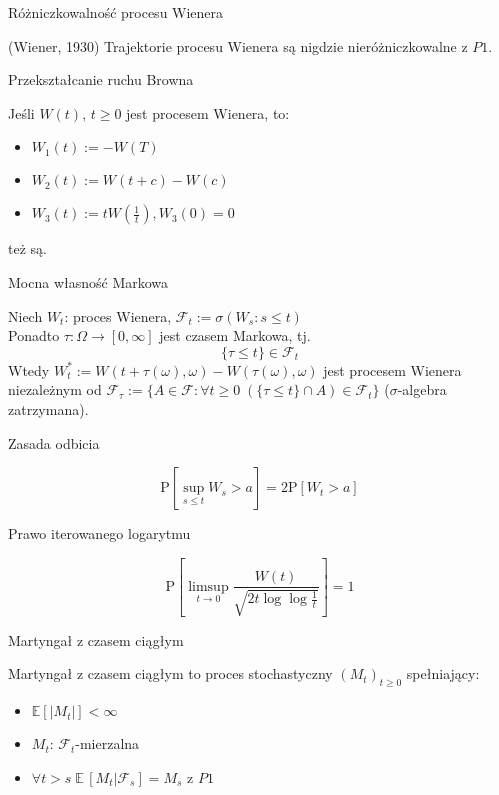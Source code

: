 \documentclass[avery5371, grid, frame]{flashcards}
\begin{document}
\begin{flashcard}[Twierdzenie]{Różniczkowalność procesu Wienera}

\smallskip
(Wiener, 1930) Trajektorie procesu Wienera są nigdzie nieróżniczkowalne z $P1$.
\end{flashcard}

\begin{flashcard}[Twierdzenie]{Przekształcanie ruchu Browna}

\smallskip
Jeśli $W(t)$, $t \geq 0$ jest procesem Wienera, to:
\begin{itemize}
\item $W_1(t) := -W(T)$
\item $W_2(t) := W(t+c) - W(c)$
\item $W_3(t) := tW(\frac{1}{t}), W_3(0)=0$ 
\end{itemize}
też są.	
\end{flashcard}

\begin{flashcard}[Twierdzenie]{Mocna własność Markowa}

\smallskip
Niech $W_t$: proces Wienera, $\mathcal{F}_t := \sigma (W_s : s \leq t) $ \\
Ponadto $\tau: \Omega \rightarrow [0, \infty]$ jest czasem Markowa, tj. $$ \{ \tau \leq t \} \in \mathcal{F}_t$$
Wtedy $W ^* _t := W(t + \tau(\omega), \omega) - W(\tau(\omega), \omega)$ jest procesem Wienera niezależnym od $\mathcal{F}_\tau := \{ A \in \mathcal{F} : \forall t \geq 0 \; ( \{\tau \leq t \} \cap A) \in \mathcal{F}_t \} $ ($\sigma$-algebra zatrzymana).
\end{flashcard}

\begin{flashcard}[Twierdzenie]{Zasada odbicia}

\smallskip
$$\text{P} [ \sup _{ s \leq t } W_s > a ] = 2 \text{P} [ W_t > a ] $$ 
\end{flashcard}

\begin{flashcard}[Twierdzenie]{Prawo iterowanego logarytmu}

\smallskip
$$ \text{P} \left[ \limsup _{t \rightarrow 0} \frac{W(t)}{\sqrt{2t \log \log \frac{1}{t} }} \right] = 1 $$
\end{flashcard}


\begin{flashcard}[Definicja]{Martyngał z czasem ciągłym}

\smallskip
Martyngał z czasem ciągłym to proces stochastyczny $(M_t)_{t \geq 0}$ spełniający:
\begin{itemize}
\item $\mathbb{E} [|M_t|] < \infty$
\item $M_t$: $\mathcal{F}_t$-mierzalna
\item $\forall t > s \; \mathbb{E} \, [ M_t | \mathcal{F}_s ] = M_s$ z $P1$
\end{itemize}
\end{flashcard}
\end{document}
